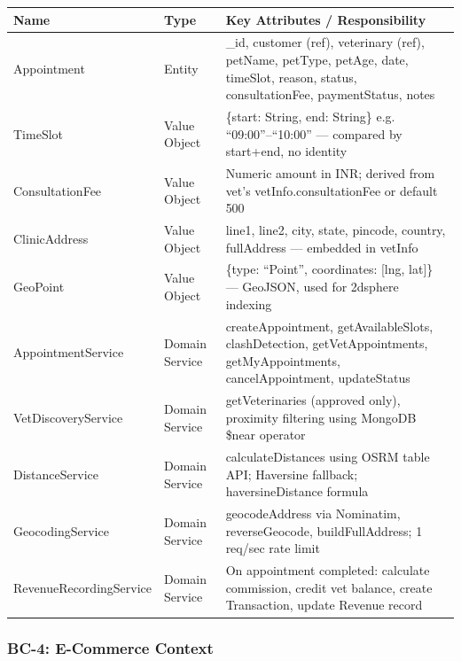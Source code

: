 \documentclass[12pt,a4paper]{article}
\begin{document}
\begin{center}
\begin{tabular}{@{}p{3.5cm}p{2cm}p{8.5cm}@{}}
\toprule
\textbf{Name} & \textbf{Type} & \textbf{Key Attributes / Responsibility} \\
\midrule
Appointment & Entity & \_id, customer (ref), veterinary (ref), petName, petType, petAge, date, timeSlot, reason, status, consultationFee, paymentStatus, notes \\
TimeSlot & Value Object & \{start: String, end: String\} e.g. ``09:00''--``10:00'' — compared by start+end, no identity \\
ConsultationFee & Value Object & Numeric amount in INR; derived from vet's vetInfo.consultationFee or default 500 \\
ClinicAddress & Value Object & line1, line2, city, state, pincode, country, fullAddress — embedded in vetInfo \\
GeoPoint & Value Object & \{type: ``Point'', coordinates: [lng, lat]\} — GeoJSON, used for 2dsphere indexing \\
AppointmentService & Domain Service & createAppointment, getAvailableSlots, clashDetection, getVetAppointments, getMyAppointments, cancelAppointment, updateStatus \\
VetDiscoveryService & Domain Service & getVeterinaries (approved only), proximity filtering using MongoDB \$near operator \\
DistanceService & Domain Service & calculateDistances using OSRM table API; Haversine fallback; haversineDistance formula \\
GeocodingService & Domain Service & geocodeAddress via Nominatim, reverseGeocode, buildFullAddress; 1 req/sec rate limit \\
RevenueRecordingService & Domain Service & On appointment completed: calculate commission, credit vet balance, create Transaction, update Revenue record \\
\bottomrule
\end{tabular}
\end{center}

\subsubsection{BC-4: E-Commerce Context}
\end{document}
